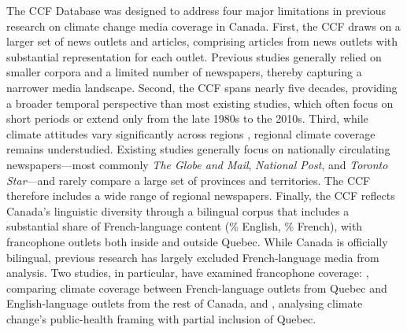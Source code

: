 \documentclass[12pt]{article}
\renewcommand\_{\texttt{\detokenize{_}\allowbreak}}
\begin{document}
The CCF Database was designed to address four major limitations in previous research on climate change media coverage in Canada. First, the CCF draws on a larger set of news outlets and articles, comprising \CCFarticles{} articles from \CCFnewspapers{} news outlets with substantial representation for each outlet. Previous studies generally relied on smaller corpora and a limited number of newspapers, thereby capturing a narrower media landscape. Second, the CCF spans nearly five decades, providing a broader temporal perspective than most existing studies, which often focus on short periods or extend only from the late 1980s to the 2010s. Third, while climate attitudes vary significantly across regions \autocite{hatch_what_2025}, regional climate coverage remains understudied. Existing studies generally focus on nationally circulating newspapers---most commonly \textit{The Globe and Mail}, \textit{National Post}, and \textit{Toronto Star}---and rarely compare a large set of provinces and territories. The CCF therefore includes a wide range of regional newspapers. Finally, the CCF reflects Canada’s linguistic diversity through a bilingual corpus that includes a substantial share of French-language content (\CCFenshare{}\% English, \CCFfrshare{}\% French), with francophone outlets both inside and outside Quebec. While Canada is officially bilingual, previous research has largely excluded French-language media from analysis. Two studies, in particular, have examined francophone coverage: \textcite{young_comparing_2012}, comparing climate coverage between French-language outlets from Quebec and English-language outlets from the rest of Canada, and \textcite{king_how_2019}, analysing climate change's public-health framing with partial inclusion of Quebec.
\end{document}
